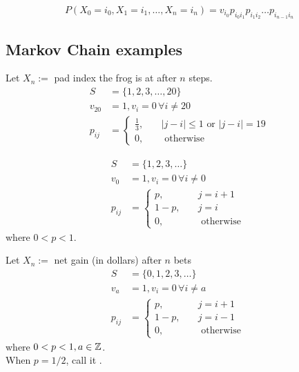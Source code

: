 \documentclass[11pt]{article}
\begin{document}
    \remark
    $$P(X_0 = i_0, X_1 = i_1, \hdots, X_n = i_n) = v_{i_0}p_{i_0i_1}p_{i_1i_2} \hdots p_{i_{n-1}i_n}$$
    
    \subsection{Markov Chain examples}
    Let $X_n :=$ pad index the frog is at after $n$ steps.
    \begin{align*}
    	S &= \{1, 2, 3, \hdots, 20\}\\
    	v_{20} &= 1, v_i = 0 \, \forall i \neq 20 \\
    	p_{ij} &= \begin{cases}
    		\frac{1}{3}, \quad &|j - i| \leq 1 \text{ or } |j - i| = 19\\
    	0, \quad &\text{ otherwise }
    	\end{cases}
    \end{align*}
    
    \begin{align*}
    	S &= \{1, 2, 3, \hdots \}\\
    	v_{0} &= 1, v_i = 0 \, \forall i \neq 0 \\
    	p_{ij} &= \begin{cases}
    		p, \quad  &j = i + 1\\
    		1 - p, \quad &j = i \\
    		0, \quad &\text{ otherwise }
    	\end{cases}
    \end{align*}
    where $0 < p < 1$.
    
    Let $X_n :=$ net gain (in dollars) after $n$ bets
    \begin{align*}
    	S &= \{0, 1, 2, 3, \hdots \}\\
    	v_{a} &= 1, v_i = 0 \, \forall i \neq a \\
    	p_{ij} &= \begin{cases}
    		p, \quad  &j = i + 1\\
    		1 - p, \quad &j = i - 1 \\
    		0, \quad &\text{ otherwise }
    	\end{cases}
    \end{align*}
    where $0 < p < 1, a \in \mathbb{Z}$. \\
     When $p = 1/2$, call it .
    
\end{document}
